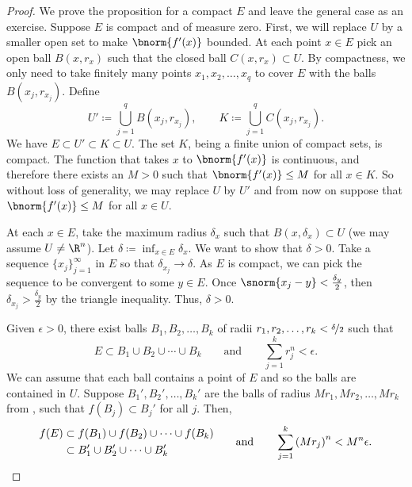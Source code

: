 \begin{proof}
We prove the proposition for a compact $E$ and leave the general case as
an exercise.
Suppose $E$ is compact and of measure zero.
First, we will replace $U$ by a smaller open set to make $\bnorm{f'(x)}$ bounded.
At each point $x \in
E$ pick an open ball $B(x,r_x)$ such that the closed ball $C(x,r_x) \subset
U$.  By compactness, we only need to take finitely
many points $x_1,x_2,\ldots,x_q$ to cover $E$ with the balls $B(x_j,r_{x_j})$.  Define
\begin{equation*}
U' \coloneqq \bigcup_{j=1}^q B(x_j,r_{x_j}), \qquad
K \coloneqq \bigcup_{j=1}^q C(x_j,r_{x_j}).
\end{equation*}
We have $E \subset U' \subset K \subset U$.  The set $K$, being a finite
union of compact sets, is compact.
The function that takes $x$ to $\bnorm{f'(x)}$ is continuous, and therefore
there exists an $M > 0$ such that $\bnorm{f'(x)} \leq M$ for all $x \in K$.
So without loss of generality, we may replace $U$ by $U'$ and from now on
suppose that $\bnorm{f'(x)} \leq M$ for all $x \in U$.

At each $x \in E$, take the maximum radius $\delta_x$
such that $B(x,\delta_x) \subset U$ (we may assume $U \not= \R^n$).
Let $\delta \coloneqq \inf_{x\in E} \delta_x$.
We want to show that $\delta > 0$.
Take a sequence $\{ x_j \}_{j=1}^\infty$ in $E$ so that $\delta_{x_j} \to \delta$.
As $E$ is compact, we can pick the sequence to be convergent to some $y \in
E$.  Once $\snorm{x_j-y} < \frac{\delta_y}{2}$, then
$\delta_{x_j} > \frac{\delta_y}{2}$ by the triangle inequality.
Thus, $\delta > 0$.

Given $\epsilon > 0$, there exist balls $B_1,B_2,\ldots,B_k$ of radii
$r_1,r_2,\ldots,r_k < \nicefrac{\delta}{2}$ such that
\begin{equation*}
E \subset B_1 \cup B_2 \cup \cdots \cup B_k
\qquad \text{and} \qquad
\sum_{j=1}^k r_j^n < \epsilon.
\end{equation*}
We can assume that each ball contains a point of $E$ and so
the balls are contained in $U$.
Suppose $B_1', B_2', \ldots, B_k'$ are the balls of radius
$Mr_1, Mr_2, \ldots, Mr_k$ from
, such that $f(B_j) \subset B_j'$ for all $j$.
Then,
\begin{equation*}
\begin{aligned}
f(E)
&
\subset f(B_1) \cup f(B_2) \cup \cdots \cup f(B_k)
\\
&
\subset B_1' \cup B_2' \cup \cdots \cup B_k'
\end{aligned}
\qquad \text{and} \qquad
\sum_{j=1}^k {(Mr_j)}^n
 < M^n \epsilon. \qedhere
\end{equation*}
\end{proof}

